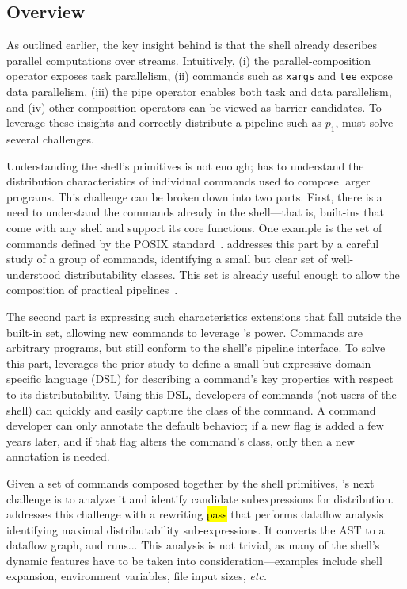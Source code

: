 \documentclass[sigplan,10pt,review,anonymous]{acmart}
\newcommand{\etc}{{\em etc.}\xspace}
\newcommand{\ttt}[1]{\texttt{\small #1}}
\newcommand{\todo}[1]{\hl{#1}\xspace}
\begin{document}
\subsection{Overview}

As outlined earlier, the key insight behind \sys is that the shell already describes parallel computations over streams.
Intuitively,
 (i) the parallel-composition operator exposes task parallelism,
 (ii) commands such as \ttt{xargs} and \ttt{tee} expose data parallelism,
 (iii) the pipe operator enables both task and data parallelism, and
 (iv)  other composition operators can be viewed as barrier candidates.
To leverage these insights and correctly distribute a pipeline such as $p_1$, \sys must solve several challenges.

Understanding the shell's primitives is not enough;
  \sys has to understand the distribution characteristics of individual commands used to compose larger programs.
This challenge can be broken down into two parts.
First, there is a need to understand the commands already in the shell---that is, built-ins that come with any shell and support its core functions.
One example is the set of commands defined by the \textsc{POSIX} standard~\cite{}.
\sys addresses this part by a careful study of a group of commands, identifying a small but clear set of well-understood distributability classes.
This set is already useful enough to allow the composition of practical pipelines~.

The second part is expressing such characteristics extensions that fall outside the built-in set, allowing new commands to leverage \sys's power.
Commands are arbitrary programs, but still conform to the shell's pipeline interface.
To solve this part, \sys leverages the prior study to define a small but expressive domain-specific language (DSL) for describing a command's key properties with respect to its distributability.
Using this DSL, developers of commands (not users of the shell) can quickly and easily capture the class of the command.
A command developer can only annotate the default behavior;
  if a new flag is added a few years later, and if that flag alters the command's class, only then a new annotation is needed.

Given a set of commands composed together by the shell primitives, \sys's next challenge is to analyze it and identify candidate subexpressions for distribution.
\sys addresses this challenge with a rewriting \todo{pass} that performs dataflow analysis identifying maximal distributability sub-expressions.
It converts the AST to a dataflow graph, and runs...
This analysis is not trivial, as many of the shell's dynamic features have to be taken into consideration---examples include shell expansion, environment variables, file input sizes, \etc
\end{document}
